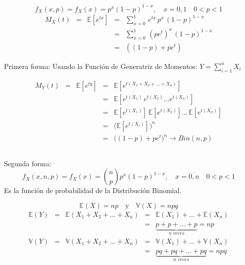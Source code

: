 \documentclass[
  ignorenonframetext,
]{beamer}
\begin{document}
\hypertarget{section-1}{%
\subsection{}\label{section-1}}

\begin{frame}{}

\[f_X(x,p)=f_X (x)= p^x (1-p)^{1-x},\quad x=0,1 \quad 0<p<1\]
\[\begin{matrix}
M_X(t) & = & \mathbb{E}[e^{tx}] & = &\displaystyle\sum_{x=0}^{1} \,e^{tx} \,p^x \,(1-p)^{1-x} \\ 
 &  &  &=  & \displaystyle\sum_{x=0}^{1} \,(pe^t)^{x} \,(1-p)^{1-x}\\
 &  &  &=  &  ((1-p)+pe^t)
\end{matrix}
\]

\justifying Primera forma: Usando la Función de Generatriz de Momentos:
\(Y=\displaystyle \sum_{i=1}^{n}X_i\)

\[\begin{matrix}
M_Y(t) & = & \mathbb{E}[e^{ty}] & = & \mathbb{E}[e^{t(X_1+X_2+...+X_n)}] \\  &  &  &=  & \mathbb{E}[e^{t(X_1)} \, e^{t(X_2)}...e^{t(X_n)}] \\
 &  &  &=  & \mathbb{E}[e^{t(X_1)}] \, \mathbb{E}[e^{t(X_2)}]... \,\mathbb{E}[e^{t(X_n)}]\\
 &  &  &=  &\big(\mathbb{E}[e^{t(X_i)}]\big)^n\\
  &  &  &=  &\bigg((1-p)+pe^t\bigg)^n \longrightarrow Bin(n,p)
\end{matrix}
\]

\end{frame}

\hypertarget{section-2}{%
\subsection{}\label{section-2}}

\begin{frame}{}

Segunda forma:
\[f_X(x,n,p)=f_X (x)= \binom{n}{p} p^x (1-p)^{1-x},\quad x=\overline{0,n} \quad 0<p<1\]
Es la función de probabilidad de la Distribución Binomial.

\[\mathbb{E}(X)=np \quad \mbox{y}\quad \mathbb{V}(X)=npq \]
\[\begin{matrix}
\mathbb{E}(Y) & = & \mathbb{E}(X_1+X_2+...+
X_n) & = & \mathbb{E}(X_1)+...+\mathbb{E}(X_n)\\ 
 &  &  &=  &\underbrace{p+p+...+p}_{n \,\,veces} =np\\
\mathbb{V}(Y) & = & \mathbb{V}(X_1+X_2+...+
X_n) & = & \mathbb{V}(X_1)+...+\mathbb{V}(X_n)\\ 
 &  &  &=  &\underbrace{pq+pq+...+pq}_{n \,\,veces} =npq
\end{matrix}
\]

\end{frame}
\end{document}
